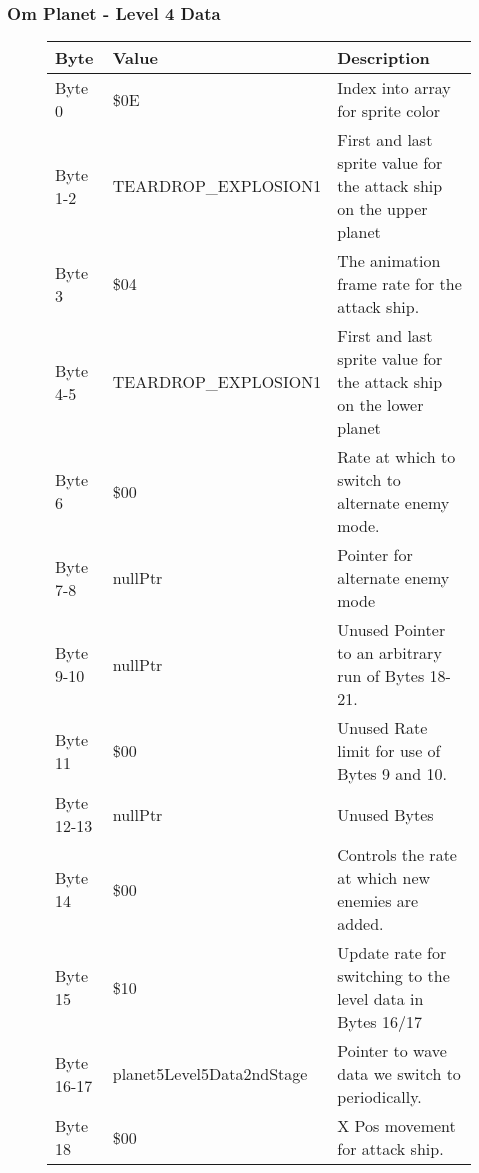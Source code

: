 \clearpage
\subsubsection{Om Planet - Level 4 Data}

\begin{figure}[H]
  {
  \setlength{\tabcolsep}{3.0pt}
  \setlength\cmidrulewidth{\heavyrulewidth} %
  \begin{adjustbox}{width=12cm}

\begin{tabular}{lll}
\toprule
 Byte       & Value                     & Description                                                         \\
\midrule
 Byte 0     & \$0E                       & Index into array for sprite color                                   \\
 Byte 1-2   & TEARDROP\_EXPLOSION1       & First and last sprite value for the attack ship on the upper planet \\
 Byte 3     & \$04                       & The animation frame rate for the attack ship.                       \\
 Byte 4-5   & TEARDROP\_EXPLOSION1       & First and last sprite value for the attack ship on the lower planet \\
 Byte 6     & \$00                       & Rate at which to switch to alternate enemy mode.                    \\
 Byte 7-8   & nullPtr                   & Pointer for alternate enemy mode                                    \\
 Byte 9-10  & nullPtr                   & Unused Pointer to an arbitrary run of Bytes 18-21.                  \\
 Byte 11    & \$00                       & Unused Rate limit for use of Bytes 9 and 10.                        \\
 Byte 12-13 & nullPtr                   & Unused Bytes                                                        \\
 Byte 14    & \$00                       & Controls the rate at which new enemies are added.                   \\
 Byte 15    & \$10                       & Update rate for switching to the level data in Bytes 16/17          \\
 Byte 16-17 & planet5Level5Data2ndStage & Pointer to wave data we switch to periodically.                     \\
 Byte 18    & \$00                       & X Pos movement for attack ship.                                     \\

\end{tabular}
\end{adjustbox}}
\end{figure}
